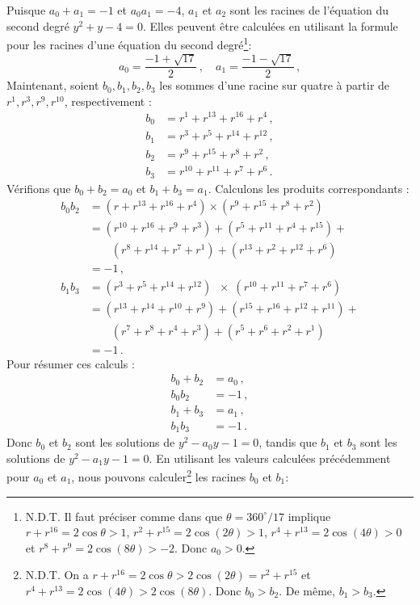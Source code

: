 Puisque $a_0+a_1=-1$ et $a_0 a_1=-4$, $a_1$ et $a_2$ sont les racines de l'équation du second degré $y^2+y-4=0$. Elles peuvent être calculées en utilisant la formule pour les racines d'une équation du second degré\footnote{N.D.T. Il faut préciser comme dans \cite{Carrega} que $\theta=360^\circ/17$ implique $r+r^{16}=2\cos \theta>1$, $r^2+r^{15}=2\cos(2\theta)>1$,  $r^4+r^{13}=2\cos (4\theta)>0$ et $r^8+r^9=2\cos(8\theta)>-2$. Donc $a_0>0$.}:
\[
a_{0} = \frac{-1+\sqrt{17}}{2}\,,\quad a_{1} = \frac{-1-\sqrt{17}}{2}\,,
\]
Maintenant, soient $b_0,b_1,b_2,b_3$ les sommes d'une racine sur quatre à partir de $r^1,r^3,r^9,r^{10}$, respectivement :
\begin{align*}
b_0&= r^1+ r^{13} + r^{16} + r^4\,,\\
b_1&= r^3+ r^{5} + r^{14} + r^{12}\,,\\
b_2&= r^9+ r^{15} + r^{8} + r^2\,,\\
b_3&= r^{10}+ r^{11} + r^{7} + r^6\,.
\end{align*}
Vérifions que $b_0+b_2=a_0$ et $b_1+b_3=a_1$. Calculons les produits correspondants :
\begin{align*}
b_0b_2&=(r + r^{13} + r^{16} +r^4)\times (r^9 + r^{15} + r^{8} +r^{2})\\
&=(r^{10}+r^{16}+r^9+r^3)+(r^{5}+r^{11}+r^4+r^{15})+\\
&\quad \quad (r^{8}+r^{14}+r^7+r^1)+(r^{13}+r^{2}+r^{12}+r^6)\\
&=-1\,,\\
b_1b_3&=(r^3 + r^{5} + r^{14} +r^{12})\;\;\times\;(r^{10} + r^{11} + r^{7} +r^{6})\\
&=(r^{13}+r^{14}+r^{10}+r^9)+(r^{15}+r^{16}+r^{12}+r^{11})+\\
&\quad \quad (r^{7}+r^{8}+r^4+r^3) +(r^{5}+r^{6}+r^{2}+r^1)\\
&=-1\,.
\end{align*}
Pour résumer ces calculs :
\begin{align*}
b_0+b_2&=a_0\,,\\
b_0b_2&=-1\,,\\
b_1+b_3&=a_1\,,\\
b_1b_3&=-1\,.
\end{align*}
Donc $b_0$ et $b_2$ sont les solutions de $y^2-a_0y-1= 0$, tandis que $b_1$ et $b_3$ sont les solutions de $y^2-a_1y-1 =0$. En utilisant les valeurs calculées précédemment pour $a_0$ et $a_1$, nous pouvons calculer\footnote{N.D.T. On a $r+r^{16}=2\cos \theta>2\cos(2\theta)=r^2+r^{15}$ et $r^4+r^{13}=2\cos (4\theta)>2\cos(8\theta)$. Donc $b_0>b_2$. De même, $b_1>b_3$.} les racines $b_0$ et $b_1$:
